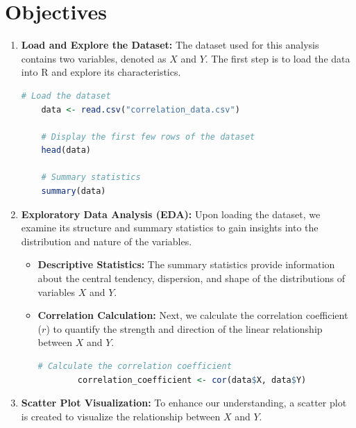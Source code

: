 \documentclass[10pt]{book}
\begin{document}
\section{Objectives}

\begin{enumerate}
    \item \textbf{Load and Explore the Dataset:} The dataset used for this analysis contains two variables, denoted as \(X\) and \(Y\). The first step is to load the data into R and explore its characteristics.
    
    \begin{lstlisting}[language=R]
    # Load the dataset
    data <- read.csv("correlation_data.csv")
    
    # Display the first few rows of the dataset
    head(data)
    
    # Summary statistics
    summary(data)
    \end{lstlisting}
    
    \item \textbf{Exploratory Data Analysis (EDA):} Upon loading the dataset, we examine its structure and summary statistics to gain insights into the distribution and nature of the variables.
    
    \begin{itemize}
        \item \textbf{Descriptive Statistics:} The summary statistics provide information about the central tendency, dispersion, and shape of the distributions of variables \(X\) and \(Y\).
        
        \item \textbf{Correlation Calculation:} Next, we calculate the correlation coefficient (\(r\)) to quantify the strength and direction of the linear relationship between \(X\) and \(Y\).
        
        \begin{lstlisting}[language=R]
        # Calculate the correlation coefficient
        correlation_coefficient <- cor(data$X, data$Y)
        \end{lstlisting}
    \end{itemize}
    
    \item \textbf{Scatter Plot Visualization:} To enhance our understanding, a scatter plot is created to visualize the relationship between \(X\) and \(Y\).
    


    


\end{enumerate}
\end{document}
